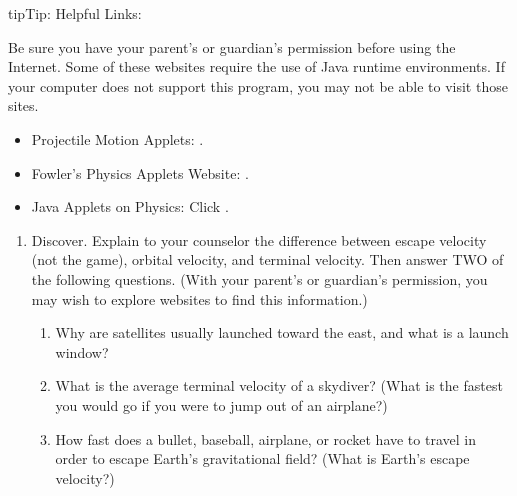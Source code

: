 \documentclass[letterpaper,10pt,english,openany,oneside]{sphinxmanual}
\begin{document}
\begin{sphinxadmonition}{tip}{Tip:}
Helpful Links:

Be sure you have your parent’s or guardian’s permission before using the Internet. Some of these websites require the use of Java runtime environments. If your computer does not support this program, you may not be able to visit those sites.
\begin{itemize}
\item {} 
Projectile Motion Applets: .

\item {} 
Fowler’s Physics Applets Website: .

\item {} 
Java Applets on Physics: Click .

\end{itemize}
\end{sphinxadmonition}
\begin{enumerate}
%
\setcounter{enumi}{1}
\item {} 
Discover. Explain to your counselor the difference between escape velocity (not the game), orbital velocity, and terminal velocity. Then answer TWO of the following questions. (With your parent’s or guardian’s permission, you may wish to explore websites to find this information.)
\begin{enumerate}
%
\item {} 
Why are satellites usually launched toward the east, and what is a launch window?

\item {} 
What is the average terminal velocity of a skydiver? (What is the fastest you would go if you were to jump out of an airplane?)

\item {} 
How fast does a bullet, baseball, airplane, or rocket have to travel in order to escape Earth’s gravitational field? (What is Earth’s escape velocity?)

\end{enumerate}

\end{enumerate}
\end{document}
